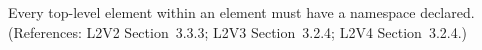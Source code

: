 Every top-level element within an  element must have a
namespace declared.  (References: L2V2 Section~3.3.3;
L2V3 Section~3.2.4; L2V4 Section~3.2.4.)
